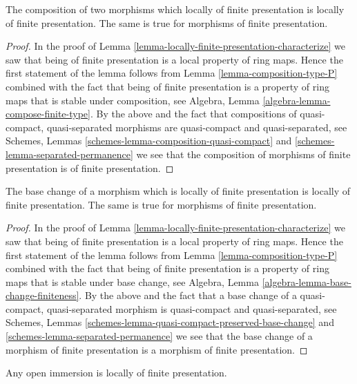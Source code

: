 \begin{lemma}
\label{lemma-composition-finite-presentation}
The composition of two morphisms which locally of finite presentation is
locally of finite presentation.
The same is true for morphisms of finite presentation.
\end{lemma}

\begin{proof}
In the proof of Lemma \ref{lemma-locally-finite-presentation-characterize}
we saw that being of finite presentation is a local property of ring maps.
Hence the first statement of the lemma follows from
Lemma \ref{lemma-composition-type-P} combined
with the fact that being of finite presentation
is a property of ring maps that is
stable under composition, see
Algebra, Lemma \ref{algebra-lemma-compose-finite-type}.
By the above and the fact that compositions of
quasi-compact, quasi-separated morphisms are
quasi-compact and quasi-separated, see
Schemes, Lemmas \ref{schemes-lemma-composition-quasi-compact}
and \ref{schemes-lemma-separated-permanence}
we see that the composition of morphisms of finite presentation is
of finite presentation.
\end{proof}

\begin{lemma}
\label{lemma-base-change-finite-presentation}
The base change of a morphism which is locally of finite presentation
is locally of finite presentation. The same is true for morphisms of
finite presentation.
\end{lemma}

\begin{proof}
In the proof of Lemma \ref{lemma-locally-finite-presentation-characterize}
we saw that being of finite presentation is a local property of ring maps.
Hence the first statement of the lemma follows from
Lemma \ref{lemma-composition-type-P} combined
with the fact that being of finite presentation
is a property of ring maps that is
stable under base change, see
Algebra, Lemma \ref{algebra-lemma-base-change-finiteness}.
By the above and the fact that a base change of a
quasi-compact, quasi-separated morphism is quasi-compact
and quasi-separated, see
Schemes, Lemmas \ref{schemes-lemma-quasi-compact-preserved-base-change}
and \ref{schemes-lemma-separated-permanence}
we see that the base change of a morphism of finite presentation is
a morphism of finite presentation.
\end{proof}

\begin{lemma}
\label{lemma-open-immersion-locally-finite-presentation}
Any open immersion is locally of finite presentation.
\end{lemma}

